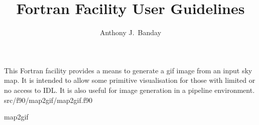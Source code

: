 
\sloppy


\title{\healpix Fortran Facility User Guidelines}
 \section[map2gif]{\nosectionname}
\label{fac:map2gif}
\author{Anthony J.~Banday}

\begin{facility}
{This Fortran facility provides a means to generate a
gif image from an input \healpix sky map. It is intended to allow some
primitive visualisation for those with limited or no access to IDL. 
It is also useful for image generation in a pipeline environment.}
{src/f90/map2gif/map2gif.f90}
\end{facility}

\begin{f90facility}
{map2gif}
\end{f90facility}

